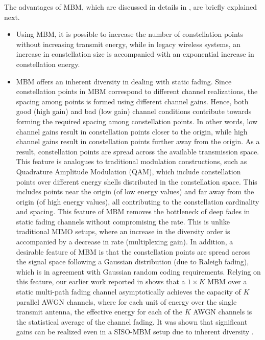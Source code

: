 The advantages of MBM, which are discussed in details in \cite{c0, isit2014}, are briefly explained next.
\begin{itemize}
\item Using MBM, it is possible to increase the number of constellation points without increasing transmit energy, while in legacy wireless systems, an increase in constellation size is accompanied with an exponential increase in constellation energy.
\item MBM offers an inherent diversity in dealing with static fading. Since constellation points in MBM correspond to different channel realizations, the spacing among points is formed using different channel gains. Hence, both good (high gain) and bad (low gain) channel conditions contribute towards forming the required spacing among constellation points. In other words, low channel gains result in constellation points closer to the origin, while high channel gains result in constellation points further away from the origin. As a result, constellation points are spread across the available transmission space. This feature is analogues to traditional modulation constructions, such as Quadrature Amplitude Modulation (QAM), which include constellation points over different energy shells distributed in the constellation space. This includes points near the origin (of low energy values) and far away from the origin (of high energy values), all contributing to the constellation cardinality and spacing. This feature of MBM removes the bottleneck of deep fades in static fading channels without compromising the rate. This is unlike traditional MIMO setups, where an increase in the diversity order is accompanied by a decrease in rate (multiplexing gain). In addition, a desirable feature of MBM is that the constellation points are spread across the signal space following a Gaussian distribution (due to Raleigh fading), which is in agreement with Gaussian random coding requirements. Relying on this feature, our earlier work reported in \cite{isit2014} shows that a $1 \times K$ MBM over a static multi-path fading channel asymptotically achieves the capacity of $K$ parallel AWGN channels, where for each unit of energy over the single transmit antenna, the effective energy for each of the $K$ AWGN channels is the statistical average of the channel fading. It was shown that significant gains can be realized even in a SISO-MBM setup due to inherent diversity \cite{c0}.


\end{itemize}
